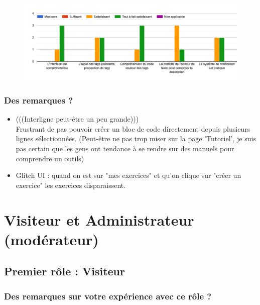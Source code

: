 \begin{figure}[H]
    \includegraphics[width=\textwidth,height=0.3\textheight,keepaspectratio]{images/googleForm/creationModifResInfo_1.png}
    \centering
\end{figure}

\subsubsection*{Des remarques ?}

\begin{itemize}
    \item (((Interligne peut-être un peu grande)))\\
    Frustrant de pas pouvoir créer un bloc de code directement depuis plusieurs lignes sélectionnées. (Peut-être ne pas trop miser sur la page 'Tutoriel', je suis pas certain que les gens ont tendance à se rendre sur des manuels pour comprendre un outils)
    \item Glitch UI : quand on est sur "mes exercices" et qu'on clique sur "créer un exercice" les exercices disparaissent.
\end{itemize}

\section{Visiteur et Administrateur (modérateur)}

\subsection{Premier rôle : Visiteur}

\subsubsection*{Des remarques sur votre expérience avec ce rôle ?}

